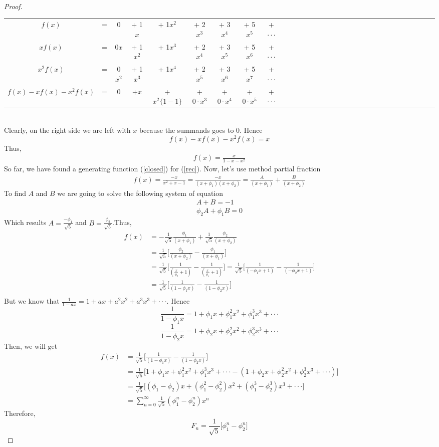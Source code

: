 \documentclass[paper=a4, fontsize=11pt,twoside]{scrartcl}		%
\theoremstyle{definition}
\theoremstyle{remark}
\begin{document}
\begin{proof}
\begin{tabular}{ccccccccccccccccccccccccccccccc}
  $f(x)$&=& 0&+ 1$x$ &+ 1$x^2$ &+ 2$x^3$ &+ 3$x^4$ &+ 5$x^5$&+$ \cdot\cdot\cdot$ \\
  $xf(x)$&=& 0$x$&+ 1$x^2$ &+ 1$x^3$ &+ 2$x^4$ &+ 3$x^5$ &+ 5$x^6$&+$ \cdot\cdot\cdot$ \\
  $x^2f(x)$&=& 0$x^2$&+ 1$x^3$ &+ 1$x^4$ &+ 2$x^5$ &+ 3$x^6$ &+ 5$x^7$&+$ \cdot\cdot\cdot$ \\
\hline
$f(x)-xf(x)-x^2f(x)$ &= & 0&+$x$&+$x^2\{1-1\}$&+$0\cdot x^3$&+$0\cdot x^4$&+$0\cdot x^5$&+$\cdot\cdot\cdot$
\end{tabular}\\
Clearly, on the right side we are left with $x$ because the summands goes to $0$. Hence
 $$
 f(x)-xf(x)-x^2f(x) = x
 $$
Thus,
\begin{align}\label{closed}
 f(x)= \frac{x}{1-x-x^2}
\end{align}
So far, we have found a generating function (\ref{closed}) for (\ref{rec}). Now, let's use method partial fraction
\begin{align*}
 f(x)= \frac{-x}{x^2+x-1}=\frac{-x}{(x+\phi_1)(x+\phi_2)}=\frac{A}{(x+\phi_1)}+\frac{B}{(x+\phi_2)}
\end{align*}
To find $A$ and $B$ we are going to solve the following system of equation
\begin{align*}
A+B=-1\\
\phi_2A+\phi_1B=0
\end{align*}
Which results $A=\frac{-\phi_1}{\sqrt{5}}$ and $B=\frac{\phi_2}{\sqrt{5}}$.Thus,
\begin{align*}
f(x)&=-\frac{1}{\sqrt{5}}\frac{\phi_1}{(x+\phi_1)}+\frac{1}{\sqrt{5}}\frac{\phi_2}{(x+\phi_2)}\\
    &=\frac{1}{\sqrt{5}}\biggl[\frac{\phi_2}{(x+\phi_2)}-\frac{\phi_1}{(x+\phi_1)}\biggl]\\
    &=\frac{1}{\sqrt{5}}\biggl[\frac{1}{(\frac{x}{\phi_2}+1)}-\frac{1}{(\frac{x}{\phi_1}+1)}\biggl]
    =\frac{1}{\sqrt{5}}\biggl[\frac{1}{(-\phi_1x+1)}-\frac{1}{(-\phi_2x+1)}\biggl]\\
    &=\frac{1}{\sqrt{5}}\biggl[\frac{1}{(1-\phi_1x)}-\frac{1}{(1-\phi_2x)}\biggl]\\
\end{align*}
But we know that $\frac{1}{1-ax}=1+ax+a^2x^2+a^3x^3+\cdot\cdot\cdot$. Hence
$$\frac{1}{1-\phi_1x}=1+\phi_1x+\phi_1^2x^2+\phi_1^3x^3+\cdot\cdot\cdot$$
$$\frac{1}{1-\phi_2x}=1+\phi_2x+\phi_2^2x^2+\phi_2^3x^3+\cdot\cdot\cdot$$
Then, we will get
\begin{align*}
f(x)&=\frac{1}{\sqrt{5}}\biggl[\frac{1}{(1-\phi_1x)}-\frac{1}{(1-\phi_2x)}\biggl]\\
    &=\frac{1}{\sqrt{5}}\biggl[1+\phi_1x+\phi_1^2x^2+\phi_1^3x^3+\cdot\cdot\cdot-(1+\phi_2x+\phi_2^2x^2+\phi_2^3x^3+\cdot\cdot\cdot)\biggl]\\  &=\frac{1}{\sqrt{5}}\biggl[(\phi_1-\phi_2)x+(\phi_1^2-\phi_2^2)x^2+(\phi_1^3-\phi_2^3)x^3+\cdot\cdot\cdot\biggl]\\
    &=\sum_{n=0}^{\infty}\frac{1}{\sqrt{5}}(\phi_1^n-\phi_2^n)x^n
\end{align*}
Therefore,
$$
F_n=\frac{1}{\sqrt{5}}\biggl[\phi_1^n-\phi_2^n \biggl]
$$
\end{proof}
\end{document}
